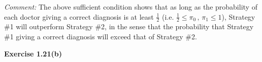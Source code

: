 \vskip 0.5cm
\noindent
\textit{Comment:}\quad
The above sufficient condition shows that as long as the probability of each doctor giving a
correct diagnosis is at least $\frac{1}{2}$ (i.e. $\frac{1}{2} \leq \pi_{0}\,,\,\pi_{1} \leq 1$),
Strategy \#1 will outperform Strategy \#2, in the sense that the probability that Strategy \#1
giving a correct diagnosis will exceed that of Strategy \#2.



\vskip 1.0cm
\noindent
\textbf{Exercise 1.21(b)}

\vskip 0.5cm
\noindent


